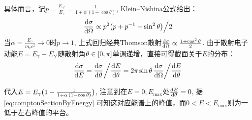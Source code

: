 \documentclass[aps,pre,12pt,preprint,%
	onecolumn,showpacs,showkeys,nofootinbib]{revtex4-1}
\begin{document}
	具体而言，记$p = \frac{E_{\gamma'}}{E_\gamma} = \frac{1}{1 + \alpha\,(1 - \cos\theta)}$, Klein–Nishina公式给出\supercite{zee2010quantum}：
	\begin{equation}
		\dv{\sigma}{\Omega}
		\propto p^2 \pqty\big{p + p^{-1} - \sin^2\theta} \Big/ 2
	\end{equation}
	当$\alpha = \frac{E_\gamma}{m_e c^2}\to 0$时$p\to 1$, 上式回归经典Thomson散射$
		\dv{\sigma}{\Omega}
		\propto\frac{1 + \cos^2\theta}{2}
	$. 由于散射电子动能$E = E_\gamma - E_{\gamma'}$随散射角$\theta\in\bqty{0,\pi}$单调递增，直接可得截面关于$E$的分布：
	\begin{equation}
		\dv{\sigma}{E}
		= \dv{\sigma}{\theta} \bigg/ \dv{E}{\theta}
		= 2\pi\sin\theta\,\dv{\sigma}{\Omega} \bigg/ \dv{E}{\theta}
		\label{eq:comptonSectionByEnergy}
	\end{equation}
	
	代入$E = E_\gamma\pqty\big{
		1 - \frac{1}{1 + \alpha\,(1 - \cos\theta)}
	}$, 注意到在$E = 0, E_{\max}$处$\dv{E}{\theta} = 0$, 据 \eqref{eq:comptonSectionByEnergy} 可知这对应能谱上的峰值，而$0 < E < E_{\max}$则为一低于左右峰值的平台。
\clearpage
	
\end{document}

